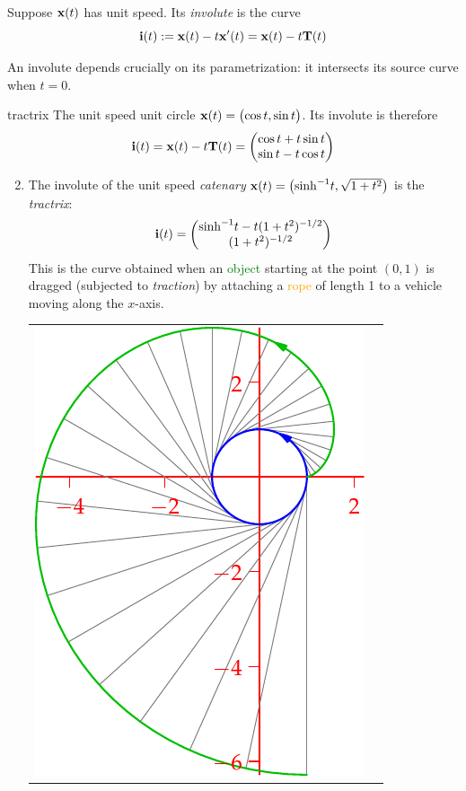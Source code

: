\begin{defn}{}{}
	Suppose ${\mathbf{x}}(t)$ has unit speed. Its \emph{involute} is the curve
	\[
		{\mathbf{i}}(t):={\mathbf{x}}(t)-t{\mathbf{x}}'(t)={\mathbf{x}}(t)-t{\mathbf{T}}(t)
	\]
\end{defn}

An involute depends crucially on its parametrization: it intersects its source curve when $t=0$.

\begin{examples}{}{tractrix}
	\exstart The unit speed unit circle ${\mathbf{x}}(t)=\bigl(\cos t,\sin t\bigr)$. Its involute is therefore
	\[
		{\mathbf{i}}(t)={\mathbf{x}}(t)-t{\mathbf{T}}(t)=\begin{pmatrix}\cos t+t\sin t\\\sin t-t\cos t\end{pmatrix}
	\]
	\begin{enumerate}\setcounter{enumi}{1}
  	\item\label{ex:tractrix1} The involute of the unit speed \emph{catenary} ${\mathbf{x}}(t)=\bigl(\sinh^{-1}\!t,\sqrt{1+t^2}\bigr)$ is the \emph{tractrix}:
		\[
			{\mathbf{i}}(t)=\begin{pmatrix}\sinh^{-1}\!t-t(1+t^2)^{-1/2}\\(1+t^2)^{-1/2}\end{pmatrix}
		\]
		This is the curve obtained when an \textcolor{Green}{object} starting at the point $(0,1)$ is dragged (subjected to \emph{traction}) by attaching a \textcolor{orange}{rope} of length 1 to a vehicle moving along the $x$-axis.
		\begin{center}
			\begin{tabular}{c@{\qquad\qquad}c}
				\href{http://math.uci.edu/~ndonalds/math162a/radii-invcirc.html}{\includegraphics[scale=0.8]{radii-invcirc2}}

\end{tabular}
\end{center}
\end{enumerate}
\end{examples}
